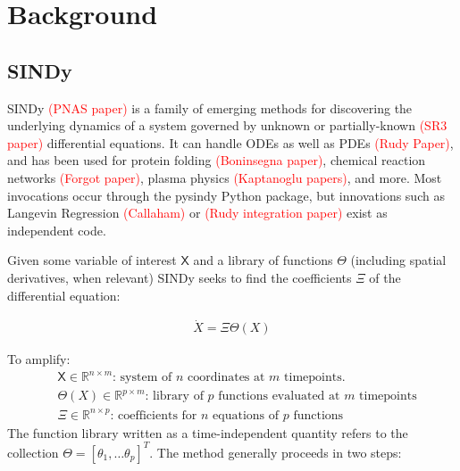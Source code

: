 \documentclass{article}
\newcommand{\red}[1]{\textcolor{red}{#1}}
\newcommand{\mat}[1]{\boldsymbol{\mathsf{#1}}}
\newcommand{\R}[1]{\mathbb{R}^{#1}}
\begin{document}

\section{Background}

\subsection{SINDy}
SINDy \red{(PNAS paper)} is a family of emerging methods for discovering the underlying dynamics of a system governed by unknown or partially-known \red{(SR3 paper)} differential equations.  It can handle ODEs as well as PDEs \red{(Rudy Paper)}, and has been used for protein folding \red{(Boninsegna paper)}, chemical reaction networks \red{(Forgot paper)}, plasma physics \red{(Kaptanoglu papers)}, and more.  Most invocations occur through the pysindy Python package, but innovations such as Langevin Regression \red{(Callaham)} or \red{(Rudy integration paper)} exist as independent code.

Given some variable of interest $\mat X$ and a library of functions $\mat \Theta$ (including spatial derivatives, when relevant) SINDy seeks to find the coefficients $\mat \Xi$ of the differential equation:

\begin{align}
    \label{eqn:sindy_ode}
    \dot X = \Xi\Theta(X)
\end{align}

To amplify:
\begin{align*}
    &\mat X \in \R{n \times m}\text{: system of $n$ coordinates at $m$ timepoints.}\\
    &\mat \Theta(X) \in \R{p \times m}\text{: library of $p$ functions evaluated at $m$ timepoints}\\
    &\mat \Xi \in \R{n \times p}\text{: coefficients for $n$ equations of $p$ functions}
\end{align*}
The function library written as a time-independent quantity refers to the collection $\mat \Theta = [\theta_1, \dots \theta_p]^T$.
The method generally proceeds in two steps: 
\end{document}
